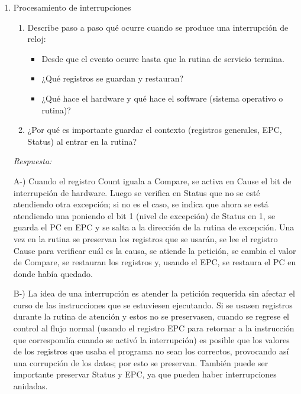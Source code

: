 \documentclass[11pt, a4paper]{article}
\begin{document}
\begin{enumerate}[leftmargin=*, label=\arabic*.]
    B-) Los dispositivos mandarían la petición de interrupción, pero el procesador no la aceptaría, por lo que sería ignorada. Esto generaría que los dispositivos no funcionasen de la forma en que se espera.
    \vspace{2cm}

    \item Procesamiento de interrupciones
    \begin{enumerate}[label=\alph*)]
        \item Describe paso a paso qué ocurre cuando se produce una interrupción de reloj:
        \begin{itemize}
            \item Desde que el evento ocurre hasta que la rutina de servicio termina.
            \item ¿Qué registros se guardan y restauran?
            \item ¿Qué hace el hardware y qué hace el software (sistema operativo o rutina)?
        \end{itemize}
        \item ¿Por qué es importante guardar el contexto (registros generales, EPC, Status) al entrar en la rutina?
    \end{enumerate}
    
    \vspace{0.2cm}
    \textit{Respuesta:}

    A-) Cuando el registro Count iguala a Compare, se activa en Cause el bit de interrupción de hardware. Luego se verifica en Status que no se esté atendiendo otra excepción; si no es el caso, se indica que ahora se está atendiendo una poniendo el bit 1 (nivel de excepción) de Status en 1, se guarda el PC en EPC y se salta a la dirección de la rutina de excepción. Una vez en la rutina se preservan los registros que se usarán, se lee el registro Cause para verificar cuál es la causa, se atiende la petición, se cambia el valor de Compare, se restauran los registros y, usando el EPC, se restaura el PC en donde había quedado.

    B-) La idea de una interrupción es atender la petición requerida sin afectar el curso de las instrucciones que se estuviesen ejecutando. Si se usasen registros durante la rutina de atención y estos no se preservasen, cuando se regrese el control al flujo normal (usando el registro EPC para retornar a la instrucción que correspondía cuando se activó la interrupción) es posible que los valores de los registros que usaba el programa no sean los correctos, provocando así una corrupción de los datos; por esto se preservan. También puede ser importante preservar Status y EPC, ya que pueden haber interrupciones anidadas.
    \vspace{2.5cm}


\end{enumerate}
\end{document}
